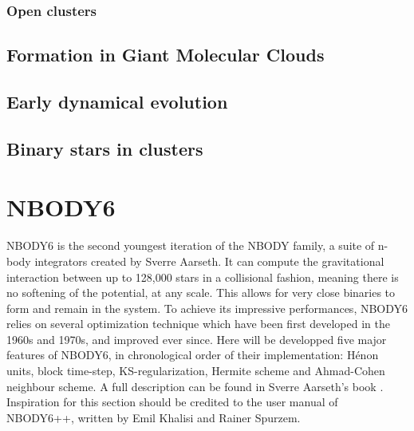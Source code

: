 %


\subsubsection*{Open clusters}







\subsection{Formation in Giant Molecular Clouds}

\subsection{Early dynamical evolution}

\subsection{Binary stars in clusters}









\newpage
\section{NBODY6}


NBODY6 is the second youngest iteration of the NBODY family, a suite of n-body integrators created by Sverre Aarseth. It can compute the gravitational interaction between up to 128,000 stars in a collisional fashion, meaning there is no softening of the potential, at any scale. This allows for very close binaries to form and remain in the system. To achieve its impressive performances, NBODY6 relies on several optimization technique which have been first developed in the 1960s and 1970s, and improved ever since. Here will be developped five major features of NBODY6, in chronological order of their implementation: H\'enon units, block time-step, KS-regularization, Hermite scheme and Ahmad-Cohen neighbour scheme. A full description can be found in Sverre Aarseth's book \citep{Aarseth2003}. Inspiration for this section should be credited to the user manual of NBODY6++, written by Emil Khalisi and Rainer Spurzem.

